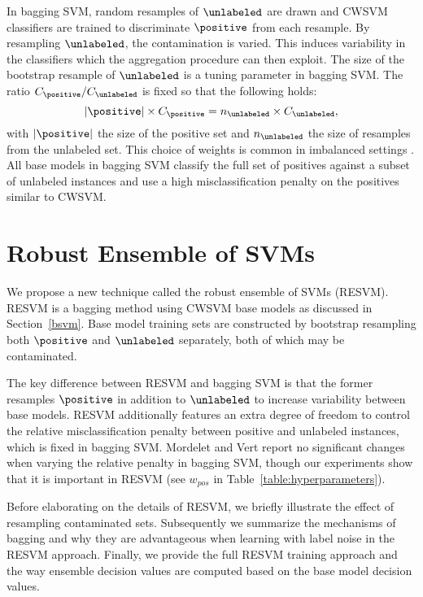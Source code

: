 In bagging SVM, random resamples of $\unlabeled$ are drawn and CWSVM classifiers are trained to discriminate $\positive$ from each resample. By resampling $\unlabeled$, the contamination is varied. This induces variability in the classifiers which the aggregation procedure can then exploit. The size of the bootstrap resample of $\unlabeled$ is a tuning parameter in bagging SVM. The ratio $C_{\positive}/C_{\unlabeled}$ is fixed so that the following holds:
\begin{equation}
|\positive| \times C_{\positive} = n_{\unlabeled} \times C_{\unlabeled}, \label{eq:bagpenalties}
\end{equation}
with $|\positive|$ the size of the positive set and $n_{\unlabeled}$ the size of resamples from the unlabeled set. This choice of weights is common in imbalanced settings \citep{cawley2006leave,daemen2009kernel}. All base models in bagging SVM classify the full set of positives against a subset of unlabeled instances and use a high misclassification penalty on the positives similar to CWSVM. %




\section{Robust Ensemble of SVMs}

We propose a new technique called the robust ensemble of SVMs (RESVM). RESVM is a bagging method using CWSVM base models as discussed in Section~\ref{bsvm}. Base model training sets are constructed by bootstrap resampling both $\positive$ and $\unlabeled$ separately, both of which may be contaminated. 

The key difference between RESVM and bagging SVM is that the former resamples $\positive$ in addition to $\unlabeled$ to increase variability between base models. RESVM additionally features an extra degree of freedom to control the relative misclassification penalty between positive and unlabeled instances, which is fixed in bagging SVM. Mordelet and Vert \citep{MORDELET-2010-523336} report no significant changes when varying the relative penalty in bagging SVM, though our experiments show that it is important in RESVM (see $w_{pos}$ in Table~\ref{table:hyperparameters}).

Before elaborating on the details of RESVM, we briefly illustrate the effect of resampling contaminated sets. Subsequently we summarize the mechanisms of bagging and why they are advantageous when learning with label noise in the RESVM approach. Finally, we provide the full RESVM training approach and the way ensemble decision values are computed based on the base model decision values.

